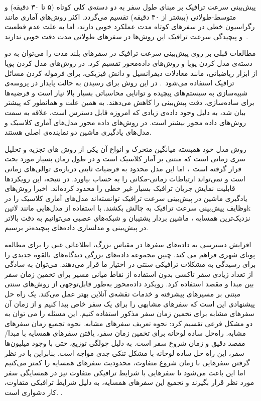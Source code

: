
پیش‌بینی سرعت ترافیک بر مبنای طول سفر به دو دسته‌ی کلی کوتاه (۵ تا ۳۰ دقیقه) و متوسط-طولانی (بیشتر از ۳۰ دقیقه) تقسیم می‌گردد.
اکثر روش‌های آماری مانند رگراسیون خطی در سفرهای کوتاه مدت عملکرد خوبی دارند، اما به علت عدم قطعیت و پیچیدگی سرعت ترافیک این روش‌ها در سفرهای طولانی مدت دقت خوبی ندارند~.

مطالعات قبلی بر روی پیش‌بینی سرعت ترافیک در سفرهای بلند مدت را می‌توان به دو دسته‌ی مدل کردن پویا و روش‌های داده‌محور تقسیم کرد.
در روش‌های مدل کردن پویا از ابزار ریاضیاتی، مانند معادلات دیفرانسیل و دانش فیزیکی، برای فرموله کردن مسائل ترافیک استفاده می‌شود~.
در این روش برای رسیدن به حالت پایدار در پروسه‌ی شبیه‌سازی به سیستم‌های پیچیده و توانایی محاسباتی بسیار بالا نیاز است و فرضیه‌ها برای ساده‌سازی، دقت پیش‌بینی را کاهش می‌دهند.
به همین علت و همانطور که پیشتر بیان شد، به دلیل وجود داده‌ی زیادی که امروزه قابل دسترس است، علاقه به سمت روش‌های داده محور بیشتر است.
در روش‌های داده محور مدل‌های آماری کلاسیک و مدل‌های یادگیری ماشین دو نماینده‌ی اصلی هستند.

روش مدل خود همبسته میانگین متحرک و انواع آن یکی از روش های تجزیه و تحلیل سری زمانی است که مبتنی بر آمار کلاسیک است
و در طول زمان بسیار مورد بحث قرار گرفته است~،
اما این مدل محدود به فرضیات ثابتی درباره‌ی توالی‌های زمانی است و نمی‌تواند ارتباطات زمانی-مکانی را به حساب بیاورد. در نتیجه، این رویکردها قابلیت نمایش جریان ترافیک بسیار غیر خطی را محدود کرده‌اند.
اخیرا روش‌های یادگیری ماشین در پیش‌بینی سرعت ترافیک توانسته‌اند مدل‌های آماری کلاسیک را در وظایف پیش‌بینی سرعت ترافیک به چالش بکشند. با استفاده از مدل‌هایی مانند ‌لاتین{k} نزدیک‌ترین همسایه ، ماشین بردار پشتیبان  و شبکه‌های عصبی  می‌توانیم به دقت بالاتر در پیش‌بینی و مدلسازی داده‌های پیچیده‌تر برسیم.


افزایش دسترسی به داده‌های سفرها در مقیاس بزرگ، اطلاعاتی غنی را برای مطالعه پویای شهری فراهم می کند.
چنین مجموعه داده‌های بزرگی دیدگاه‌های بالقوه جدیدی را برای رسیدگی به مشکلات ترافیکی سنتی در اختیار ما قرار می‌دهند.
می‌توان به سادگی از تعداد زیادی سفر تاکسی بدون استفاده از نقاط میانی مسیر  برای تخمین زمان سفر بین مبدا و مقصد استفاده کرد.
رویکرد داده‌محور به‌طور قابل‌توجهی از روش‌های سنتی مبتنی بر مسیرهای پیشرفته و خدمات نقشه‌ی آنلاین بهتر عمل می‌کند.
یک راه حل پیشنهادی این است که سفرهای مشابهی را برای یک سفر خاص پیدا کنیم و از زمان آن سفرهای مشابه برای تخمین زمان سفر مذکور استفاده کنیم.
این مسئله را می توان به دو مشکل فرعی تقسیم کرد:
 نحوه تعریف سفرهای مشابه.
 نحوه تجمیع زمان سفرهای مشابه.
راه‌حل ساده لوحانه برای تخمین زمان سفر، یافتن سفرهای همسایه با مبدا/مقصد دقیق و زمان شروع سفر است.
به دلیل چولگی توزیع، حتی با وجود میلیون‌ها سفر، این راه حل ساده لوحانه با مشکل تنکی جدی مواجه است.
بنابراین با در نظر گرفتن سفرهایی با زمان شروع متفاوت، محدودیت سفرهای همسایه را کمتر می‌کنیم اما این باعث می‌شود تا سفرهایی با شرایط ترافیکی متفاوت نیز در همسایگی سفر مورد نظر قرار بگیرند و تجمیع این سفرهای همسایه، به دلیل شرایط ترافیکی متفاوت، کار دشواری است.
.


